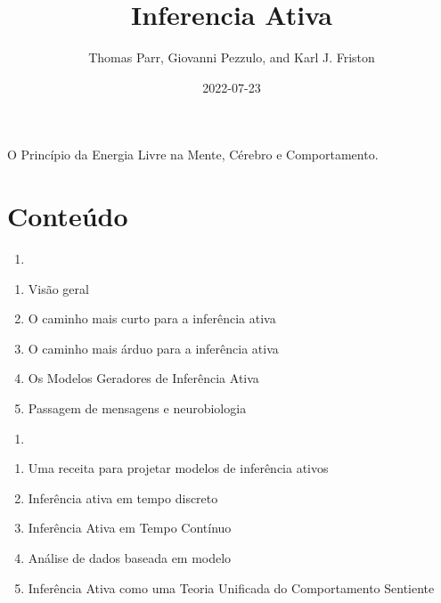 \documentclass[
  12pt,
]{book}
\title{Inferencia Ativa}
\author{Thomas Parr, Giovanni Pezzulo, and Karl J. Friston}
\date{2022-07-23}
\providecommand{\tightlist}{%
  \setlength{\itemsep}{0pt}\setlength{\parskip}{0pt}}
\begin{document}
\maketitle

{
\hypersetup{linkcolor=}
\setcounter{tocdepth}{1}
\tableofcontents
}
\listoffigures
\listoftables
O Princípio da Energia Livre na Mente, Cérebro e Comportamento.

\hypertarget{conteuxfado}{%
\chapter*{Conteúdo}\label{conteuxfado}}

\begin{enumerate}
\def\labelenumi{(\Roman{enumi})}
\tightlist
\item
\end{enumerate}

\begin{enumerate}
\def\labelenumi{\arabic{enumi}.}
\tightlist
\item
  Visão geral\\
\item
  O caminho mais curto para a inferência ativa\\
\item
  O caminho mais árduo para a inferência ativa\\
\item
  Os Modelos Geradores de Inferência Ativa\\
\item
  Passagem de mensagens e neurobiologia
\end{enumerate}

\begin{enumerate}
\def\labelenumi{(\Roman{enumi})}
\setcounter{enumi}{1}
\tightlist
\item
\end{enumerate}

\begin{enumerate}
\def\labelenumi{\arabic{enumi}.}
\setcounter{enumi}{5}
\tightlist
\item
  Uma receita para projetar modelos de inferência ativos
\item
  Inferência ativa em tempo discreto
\item
  Inferência Ativa em Tempo Contínuo
\item
  Análise de dados baseada em modelo
\item
  Inferência Ativa como uma Teoria Unificada do Comportamento Sentiente
\end{enumerate}
\end{document}
